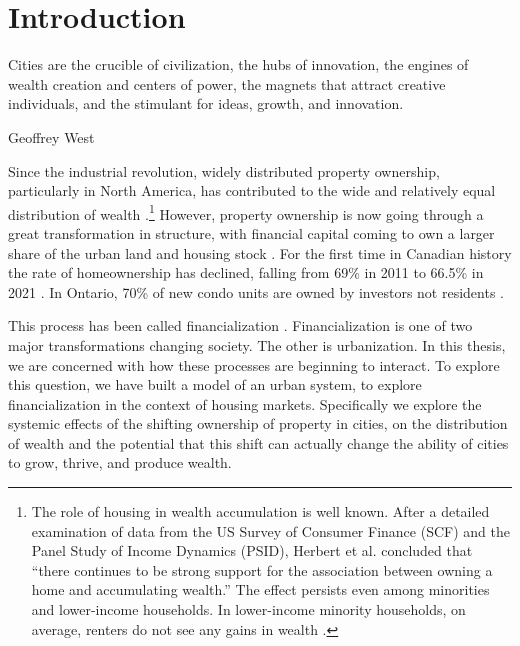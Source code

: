 \chapter{Introduction} \label{chapter-introduction}
\epigraph{Cities are the crucible of civilization, the hubs of innovation, the engines of wealth creation and centers of power, the magnets that attract creative individuals, and the stimulant for ideas, growth, and innovation.}{Geoffrey West \cite{westScaleUniversalLaws2017}}

Since the industrial revolution, widely distributed property ownership, particularly in North America, has contributed to the wide and relatively equal distribution of {wealth} \cite{pikettyCapitalTwentyfirstCentury2014, harrisGrowthHomeOwnership1977, chevanGrowthHomeOwnership1989, andrewsEvolutionHomeownershipRates2011}.\footnote{The role of housing in wealth accumulation is well known. After a detailed  examination of data from the US Survey of Consumer Finance (SCF) and the Panel Study of Income Dynamics (PSID), Herbert et al. concluded that ``there continues to be strong support for the association between owning a home and accumulating wealth.'' The effect persists even among minorities and lower-income households. In lower-income minority households, on average, renters do not see any gains in wealth \cite{herbertHomeownershipStillEffective2013}.} However, property ownership is now going through a great transformation in structure, with financial capital coming to own a larger share of the urban land and housing stock \cite{farhaReportFinancializationHousing2017, palleyFinancializationWhatIt2007}. For the first time in Canadian history the rate of homeownership has declined, falling from 69\%  in 2011 to 66.5\% in 2021 \cite{statisticscanadaBuyRentHousing2022}. %
In Ontario, 70\% of new condo units are owned by investors not residents \cite{GET77percent}. 

This process has been called financialization \cite{farhaReportFinancializationHousing2017, hansenFinanceCapitalismFinancialization2014, tomaskovic-deveyFinancializationCausesInequality2013, palleyFinancializationWhatIt2007, seccarecciaUnderstandingFinancializationHistory2013, nemtinFinancializationHousingSocial2021}. Financialization is one of two major transformations changing society. The other is urbanization. In this thesis, we are concerned with how these processes are beginning to interact. To explore this question, we have built a model of an urban system, to explore financialization in the context of housing markets. Specifically we explore the systemic effects of the shifting ownership of property in cities, on the distribution of wealth and the potential that this shift can actually change the ability of cities to grow, thrive, and produce wealth.

